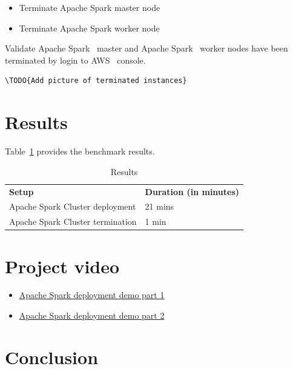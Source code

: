 \begin{itemize}
	\item Terminate Apache Spark master node
	\item Terminate Apache Spark worker node
\end{itemize}

Validate Apache Spark~\cite{hid-sp18-511-www-spark} master and Apache Spark~\cite{hid-sp18-511-www-spark}
worker nodes have been terminated by login to AWS~\cite{hid-sp18-511-www-aws} console.

\begin{verbatim}
\TODO{Add picture of terminated instances}
\end{verbatim}

\section{Results}

Table~\ref{t:results-table} provides the benchmark results.

\begin{table}[]
	\centering
	\caption{Results}\label{t:results-table}
	\begin{tabular}{ll} 
		\textbf{Setup} & \textbf{Duration (in minutes)} \\ 
		Apache Spark Cluster deployment  & 21 mins \\
		Apache Spark Cluster termination & 1 min \\
	\end{tabular}
\end{table}

\section{Project video}

\begin{itemize}
	\item \href{https://d1b10bmlvqabco.cloudfront.net/attach/jbkvbp3ed3m2ez/j6r57sr2IDo/jgenhk1lk5ly/hidsp18511\_AWS\_EC2\_Deployment\_1.mp4}{Apache Spark deployment demo part 1}
	\item \href{https://d1b10bmlvqabco.cloudfront.net/attach/jbkvbp3ed3m2ez/j6r57sr2IDo/jgeniacbvn7m/hidsp18511\_AWS\_EC2\_Deployment\_2.mp4}{Apache Spark deployment demo part 2}
\end{itemize}

\section{Conclusion}

